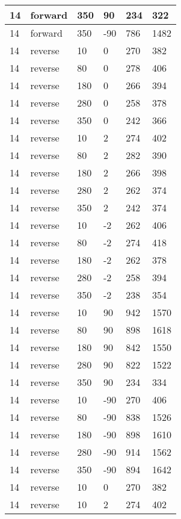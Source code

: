 \begin{longtable}{|l|l|l|l|l|l|}
			\hline
			14 & forward & 350 & 90 & 234 & 322 \\
			\hline
			14 & forward & 350 & -90 & 786 & 1482 \\
			\hline
			14 & reverse & 10 & 0 & 270 & 382 \\
			\hline
			14 & reverse & 80 & 0 & 278 & 406 \\
			\hline
			14 & reverse & 180 & 0 & 266 & 394 \\
			\hline
			14 & reverse & 280 & 0 & 258 & 378 \\
			\hline
			14 & reverse & 350 & 0 & 242 & 366 \\
			\hline
			14 & reverse & 10 & 2 & 274 & 402 \\
			\hline
			14 & reverse & 80 & 2 & 282 & 390 \\
			\hline
			14 & reverse & 180 & 2 & 266 & 398 \\
			\hline
			14 & reverse & 280 & 2 & 262 & 374 \\
			\hline
			14 & reverse & 350 & 2 & 242 & 374 \\
			\hline
			14 & reverse & 10 & -2 & 262 & 406 \\
			\hline
			14 & reverse & 80 & -2 & 274 & 418 \\
			\hline
			14 & reverse & 180 & -2 & 262 & 378 \\
			\hline
			14 & reverse & 280 & -2 & 258 & 394 \\
			\hline
			14 & reverse & 350 & -2 & 238 & 354 \\
			\hline
			14 & reverse & 10 & 90 & 942 & 1570 \\
			\hline
			14 & reverse & 80 & 90 & 898 & 1618 \\
			\hline
			14 & reverse & 180 & 90 & 842 & 1550 \\
			\hline
			14 & reverse & 280 & 90 & 822 & 1522 \\
			\hline
			14 & reverse & 350 & 90 & 234 & 334 \\
			\hline
			14 & reverse & 10 & -90 & 270 & 406 \\
			\hline
			14 & reverse & 80 & -90 & 838 & 1526 \\
			\hline
			14 & reverse & 180 & -90 & 898 & 1610 \\
			\hline
			14 & reverse & 280 & -90 & 914 & 1562 \\
			\hline
			14 & reverse & 350 & -90 & 894 & 1642 \\
			\hline
			14 & reverse & 10 & 0 & 270 & 382 \\
			\hline
			14 & reverse & 10 & 2 & 274 & 402 \\

\end{longtable}
